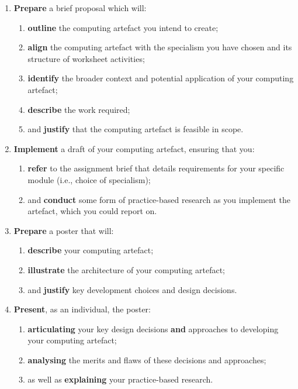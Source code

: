 \documentclass{../../fal_assignment}
\begin{document}
\begin{enumerate}[label=(\Alph*)]
	\item \textbf{Prepare} a brief proposal which will:
		\begin{enumerate}[label=(\roman*)]
			\item \textbf{outline} the computing artefact you intend to create;
			\item \textbf{align} the computing artefact with the specialism you have chosen and its structure of worksheet activities;
			\item \textbf{identify} the broader context and potential application of your computing artefact;
			\item \textbf{describe} the work required;
			\item and \textbf{justify} that the computing artefact is feasible in scope.
		\end{enumerate}
	\item \textbf{Implement} a draft of your computing artefact, ensuring that you:
		\begin{enumerate}[label=(\roman*)]
			\item \textbf{refer} to the assignment brief that details requirements for your specific module (i.e., choice of specialism);
			\item and \textbf{conduct} some form of practice-based research as you implement the artefact, which you could report on.
		\end{enumerate}
	\item \textbf{Prepare} a poster that will:
		\begin{enumerate}[label=(\roman*)]
			\item \textbf{describe} your computing artefact;
			\item \textbf{illustrate} the architecture of your computing artefact;
			\item and \textbf{justify} key development choices and design decisions.
		\end{enumerate}
	\item \textbf{Present}, as an individual, the poster:
		\begin{enumerate}[label=(\roman*)]
			\item \textbf{articulating} your key design decisions \textbf{and} approaches to developing your computing artefact;
			\item \textbf{analysing} the merits and flaws of these decisions and approaches;
			\item as well as \textbf{explaining} your practice-based research.

\end{enumerate}
\end{enumerate}
\end{document}
